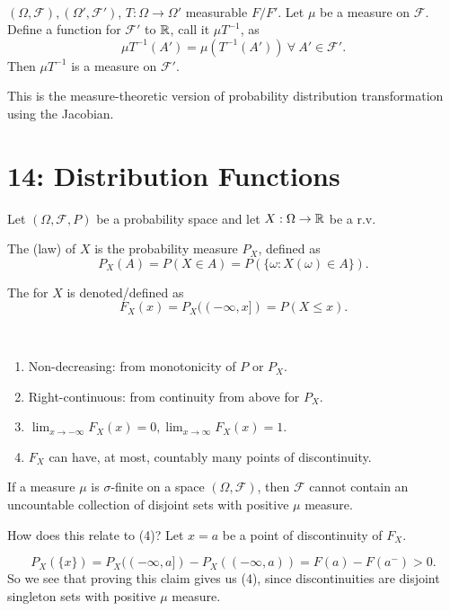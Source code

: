 \documentclass[class=article,crop=false]{standalone}
\begin{document}
~\begin{thm}[]
	$ (\Omega,\mathcal{F}),(\Omega',\mathcal{F}')$, $ T: \Omega \to \Omega'$ measurable $ F / F'$. Let  $ \mu$ be a measure on $ \mathcal{F}$. Define a function for $ \mathcal{F}'$ to $ \mathbb{R}$, call it $ \mu T^{-1}$, as
	\[
		\mu T^{-1}(A') = \mu(T^{-1}(A')) \ \forall \ A' \in \mathcal{F}'
	.\] 
	Then $ \mu T^{-1}$ is a measure on $ \mathcal{F}'$.
\end{thm}

\begin{note}[]
This is the measure-theoretic version of probability distribution transformation using the Jacobian.
\end{note}

\section*{14: Distribution Functions}

Let $ (\Omega,\mathcal{F},P)$ be a probability space and let $ X: \Omega \to \mathbb{R}$ be a r.v.

\begin{defn}[distribution]
	The  (law) of $ X$ is the probability measure $ P_X$, defined as
	\[
		P_X(A)=P(X \in A)= P(\{\omega: X(\omega) \in A\}) 
	.\]
\end{defn}

\begin{defn}
The  for $ X$ is denoted/defined as 
 \[
	 F_X(x) = P_X ((-\infty,x]) = P(X\leq x)
.\] 
\end{defn}

\begin{property}[$ F_X$]
~\begin{enumerate}[label=\arabic*)]
	\item Non-decreasing: from monotonicity of $ P$ or  $ P_X$.
	\item Right-continuous: from continuity from above for  $ P_X$.
	\item  $ \lim_{ x \to -\infty} F_X(x)=0, \lim_{ x \to \infty} F_X(x)=1 $.
	\item $ F_X$ can have, at most, countably many points of discontinuity.
\end{enumerate}

\begin{prop}[]
	If a measure $ \mu$ is $\sigma$-finite on a space $ (\Omega,\mathcal{F})$, then $ \mathcal{F}$ cannot contain an uncountable collection of disjoint sets with positive $ \mu$ measure.
\end{prop}
\begin{intuition}
	How does this relate to (4)? Let $ x=a$ be a point of discontinuity of  $ F_X$.

	 \[
		 P_X(\{x\} )=P_X((-\infty,a])-P_X((-\infty,a)) = F(a)-F(a^{-})>0
	.\]
	So we see that proving this claim gives us (4), since discontinuities are disjoint singleton sets with positive $ \mu$ measure.
\end{intuition}
\end{property}
\end{document}
